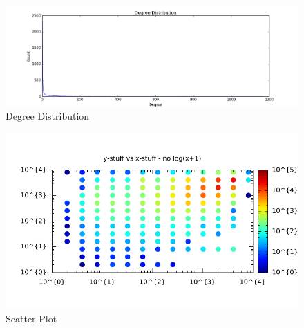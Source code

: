 \begin{figure}[H]
\centering
\includegraphics[width=1.0\linewidth]{wiki_degree}
\caption{Degree Distribution}
\end{figure}

\begin{figure}[H]
\centering
\includegraphics[width=0.8\linewidth]{wiki_scatter}
\caption{Scatter Plot}
\end{figure}

